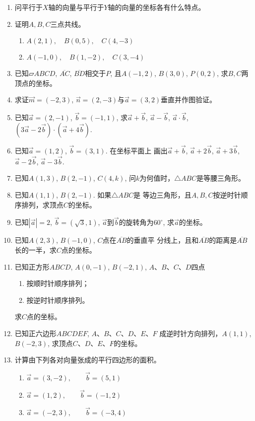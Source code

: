 \begin{enumerate}
\item 问平行于$X$轴的向量与平行于$Y$轴的向量的坐标各有什么特点。
\item 证明$A,B,C$三点共线。
\begin{enumerate}
    \item $A (2, 1) ,\quad  B (0, 5) ,\quad  C (4, -3)$
    \item $A (-1, 0) ,\quad  B (1, -2) ,\quad  C (3, -4)$
\end{enumerate}
\item 已知$\parallelogram{ABCD}$, $\overline{AC}$, $\overline{BD}$相交于$P$, 且$A(-1, 2)$, $B(3, 0)$, $P(0, 2)$, 求$B,C$两顶点的坐标。
\item 求证$\vec{m}=(-2, 3)$, $\vec{n}=(2,-3)$与$\vec{a}=(3, 2)$垂直并作图验证。
\item 已知$\vec{a}=(2,-1)$, $\vec{b}=(-1, 1)$, 求$\vec{a}+\vec{b}$, $\vec{a}-\vec{b}$, $\vec{a}\cdot \vec{b}$, 
$\left(3\vec{a}-2\vec{b}\right)\cdot\left(\vec{a}+4\vec{b}\right)$.
\item 已知$\vec{a}=(1, 2)$, $\vec{b}=(3, 1)$. 在坐标平面上
画出$\vec{a}+\vec{b}$, $\vec{a}+2\vec{b}$, $\vec{a}+3\vec{b}$, $\vec{a}-2\vec{b}$, $\vec{a}-3\vec{b}$.

\item 已知$A(1, 3)$, $B(2,-1)$, $C(4,k)$, 问$k$为何值时，$\triangle ABC$是等腰三角形。
\item 已知$A(1, 1)$, $B(2,-1)$. 如果$\triangle ABC$是
等边三角形，且$A,B,C$按逆时针顺序排列，求顶点$C$的坐标。
\item 已知$|\vec{a}| = 2$, $\vec{b}=(\sqrt{3}, 1)$, $\vec{a}$到$\vec{b}$的旋转角为$60^{\circ}$, 求$\vec{a}$的坐标。
\item 已知$A(2, 3)$, $B(-1, 0)$, $C$点在$\overline{AB}$的垂直平
分线上，且和$\overline{AB}$的距离是$\overline{AB}$长的一半，求$C$点的坐标。
\item 已知正方形$ABCD$, $A(0,-1)$, $B(-2, 1)$, 
$A$、$B$、$C$、$D$四点
\begin{multicols}{2}
\begin{enumerate}
    \item 按顺时针顺序排列；
    \item 按逆时针顺序排列。
\end{enumerate}
\end{multicols}
求$C$点的坐标。
\item 已知正六边形$ABCDEF$, $A$、$B$、$C$、$D$、$E$、$F$
成逆时针方向排列，$A(1, 1)$, $B(-2, 3)$, 求顶点$C$、$D$、$E$、$F$的坐标。
\item 计算由下列各对向量张成的平行四边形的面积。
\begin{enumerate}
    \item $\vec{a}= (3, -2) ,\qquad \vec{b}= (5, 1)$
    \item $\vec{a}= (1, 2) ,\qquad \vec{b}= (-1, 2) $
    \item $\vec{a}= (-2, 3) ,\qquad \vec{b}= (-3, 4) $
\end{enumerate}
\end{enumerate}

